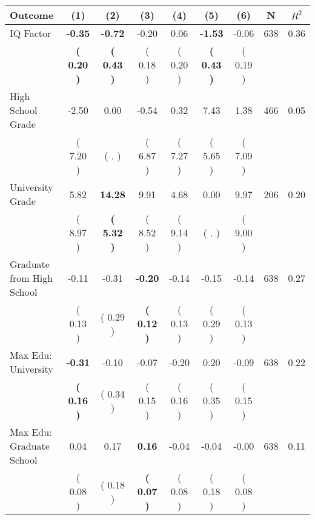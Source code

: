 \begin{tabular}{lcccccccc}
\toprule
 \textbf{Outcome} & \textbf{(1)} & \textbf{(2)} & \textbf{(3)} & \textbf{(4)} & \textbf{(5)} & \textbf{(6)} & \textbf{N} & \textbf{$ R^2$} \\
\midrule
IQ Factor & \textbf{    -0.35} & \textbf{    -0.72} &     -0.20 &      0.06 & \textbf{    -1.53} &     -0.06 & 638 &       0.36 \\ 
 & \textbf{(     0.20 )} & \textbf{(     0.43 )} & (     0.18 ) & (     0.20 ) & \textbf{(     0.43 )} & (     0.19 ) & \\
High School Grade &     -2.50 &      0.00 &     -0.54 &      0.32 &      7.43 &      1.38 & 466 &       0.05 \\ 
 & (     7.20 ) & (        . ) & (     6.87 ) & (     7.27 ) & (     5.65 ) & (     7.09 ) & \\
University Grade &      5.82 & \textbf{    14.28} &      9.91 &      4.68 &      0.00 &      9.97 & 206 &       0.20 \\ 
 & (     8.97 ) & \textbf{(     5.32 )} & (     8.52 ) & (     9.14 ) & (        . ) & (     9.00 ) & \\
Graduate from High School &     -0.11 &     -0.31 & \textbf{    -0.20} &     -0.14 &     -0.15 &     -0.14 & 638 &       0.27 \\ 
 & (     0.13 ) & (     0.29 ) & \textbf{(     0.12 )} & (     0.13 ) & (     0.29 ) & (     0.13 ) & \\
Max Edu: University & \textbf{    -0.31} &     -0.10 &     -0.07 &     -0.20 &      0.20 &     -0.09 & 638 &       0.22 \\ 
 & \textbf{(     0.16 )} & (     0.34 ) & (     0.15 ) & (     0.16 ) & (     0.35 ) & (     0.15 ) & \\
Max Edu: Graduate School &      0.04 &      0.17 & \textbf{     0.16} &     -0.04 &     -0.04 &     -0.00 & 638 &       0.11 \\ 
 & (     0.08 ) & (     0.18 ) & \textbf{(     0.07 )} & (     0.08 ) & (     0.18 ) & (     0.08 ) & \\
\bottomrule
\end{tabular}
